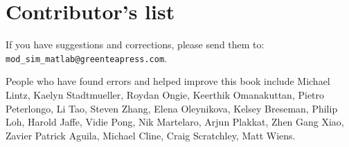 \newpage

\section*{Contributor's list}

If you have suggestions and corrections, please send them to:\\
\verb"mod_sim_matlab@greenteapress.com".


People who have found errors and helped improve this book include
Michael Lintz, 
Kaelyn Stadtmueller, 
Roydan Ongie, 
Keerthik Omanakuttan, 
Pietro Peterlongo, 
Li Tao, 
Steven Zhang, 
Elena Oleynikova, 
Kelsey Breseman, 
Philip Loh, 
Harold Jaffe, 
Vidie Pong, 
Nik Martelaro, 
Arjun Plakkat, 
Zhen Gang Xiao, 
Zavier Patrick Aguila, 
Michael Cline,
Craig Scratchley,
Matt Wiens.

\newpage
